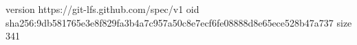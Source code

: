 version https://git-lfs.github.com/spec/v1
oid sha256:9db581765e3e8f829fa3b4a7c957a50c8e7ecf6fe08888d8e65ece528b47a737
size 341
